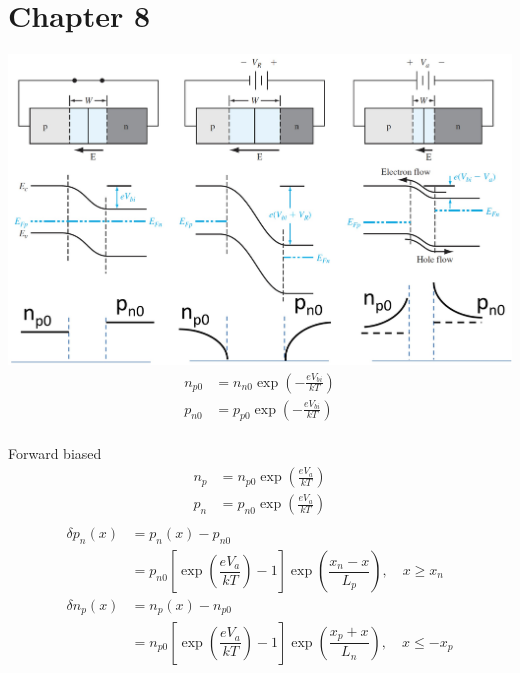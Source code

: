 \documentclass[a4paper, twocolumn]{article}
\begin{document}
\section{Chapter 8}
        \includegraphics[width=0.8\linewidth]{Charge-flow-in-pn-junction.jpg} \\
    \begin{equation*}
        \begin{aligned}
            n_{p0} &= n_{n0} \exp\left( -\frac{e V_{bi} }{kT}  \right) \\
            p_{n0} &= p_{p0} \exp\left( -\frac{e V_{bi} }{kT}  \right) \\
        \end{aligned}
    \end{equation*}
    \par Forward biased
    \begin{equation*}
        \begin{aligned}
            n_{p} &= n_{p0} \exp\left( \frac{e V_{a} }{kT}  \right) \\
            p_{n} &= p_{n0} \exp\left( \frac{e V_{a} }{kT}  \right) \\
        \end{aligned}
    \end{equation*}
    \begin{equation*}
        \begin{aligned}
            \delta p_n(x) &= p_n(x) - p_{n0}  \\ &= p_{n0} \left[ \exp\left( \dfrac{eV_a}{kT} \right) - 1\right] \exp\left( \dfrac{x_n - x}{L_p}  \right), \quad x \ge x_n \\
            \delta n_p(x) &= n_p(x) - n_{p0}  \\ &= n_{p0} \left[ \exp\left( \dfrac{eV_a}{kT}  \right) - 1 \right] \exp \left( \dfrac{x_p + x}{L_n}  \right), \quad x \le - x_p \\
        \end{aligned}
    \end{equation*}
\end{document}
